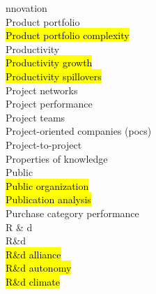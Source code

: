 \documentclass[a4paper]{article}
\begin{document}
\begin{multicols*}{2}
\begin{footnotesize}
nnovation \\ Product portfolio \\ \hl{Product portfolio complexity} \\ Productivity \\ \hl{Productivity growth} \\ \hl{Productivity spillovers} \\ Project networks \\ Project performance \\ Project teams \\ Project-oriented companies (pocs) \\ Project-to-project \\ Properties of knowledge \\ Public \\ \hl{Public organization} \\ \hl{Publication analysis} \\ Purchase category performance \\ R \& d \\ R\&d \\ \hl{R\&d alliance} \\ \hl{R\&d autonomy} \\ \hl{R\&d climate} 
\end{footnotesize}
\end{multicols*}
\end{document}
